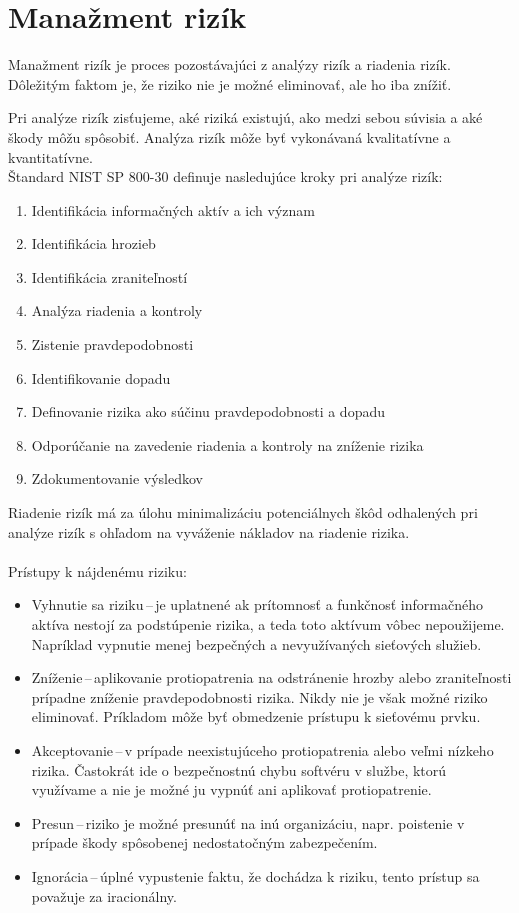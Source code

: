 \section{Manažment rizík}
Manažment rizík je proces pozostávajúci z analýzy rizík a riadenia rizík\cite{McMillan2018}. Dôležitým faktom je, že riziko nie je možné eliminovať, ale ho iba znížiť.

Pri analýze rizík zisťujeme, aké riziká existujú, ako medzi sebou súvisia a aké škody môžu spôsobiť. Analýza rizík môže byť vykonávaná kvalitatívne a kvantitatívne.\\ 
\newpage
\noindent
Štandard NIST SP 800-30\cite{7TVhmfuQFbsOANAz} definuje nasledujúce kroky pri analýze rizík:

\begin{enumerate}
	\item Identifikácia informačných aktív a ich význam
	\item Identifikácia hrozieb
	\item Identifikácia zraniteľností
	\item Analýza riadenia a kontroly 
	\item Zistenie pravdepodobnosti
	\item Identifikovanie dopadu
	\item Definovanie rizika ako súčinu pravdepodobnosti a dopadu
	\item Odporúčanie na zavedenie riadenia a kontroly na zníženie rizika  
	\item Zdokumentovanie výsledkov
\end{enumerate} 
\vspace{2em}
Riadenie rizík má za úlohu minimalizáciu potenciálnych škôd odhalených pri analýze rizík s ohľadom na vyváženie nákladov na riadenie rizika. 
\\\\
\noindent
Prístupy k nájdenému riziku\cite{Vyncke2008}\cite{McMillan2018}\cite{Jackson2010}:
\begin{itemize}
	\item Vyhnutie sa riziku\,--\,je uplatnené ak prítomnosť a funkčnosť informačného aktíva nestojí za podstúpenie rizika, a teda toto aktívum vôbec nepoužijeme. Napríklad vypnutie menej bezpečných a nevyužívaných sieťových služieb.  
	
	\item Zníženie\,--\,aplikovanie protiopatrenia na odstránenie hrozby alebo zraniteľnosti prípadne zníženie pravdepodobnosti rizika. Nikdy nie je však možné riziko eliminovať. Príkladom môže byť obmedzenie prístupu k sieťovému prvku.
	
	\item Akceptovanie\,--\,v prípade neexistujúceho protiopatrenia alebo veľmi nízkeho rizika. Častokrát ide o bezpečnostnú chybu softvéru v službe, ktorú využívame a nie je možné ju vypnúť ani aplikovať protiopatrenie.
	
	\item Presun\,--\,riziko je možné presunúť na inú organizáciu, napr. poistenie v prípade škody spôsobenej nedostatočným zabezpečením.
	
	\item Ignorácia\,--\,úplné vypustenie faktu, že dochádza k riziku, tento prístup sa považuje za iracionálny.
\end{itemize}
